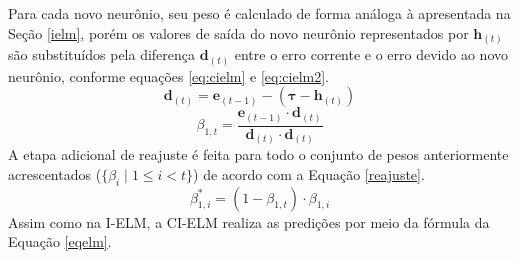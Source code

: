 Para cada novo neurônio, seu peso é calculado de forma análoga à apresentada na
Seção \ref{ielm}, porém os valores de saída do novo neurônio representados por
$\bm{h}_{(t)}$ são substituídos pela diferença $\bm{d}_{(t)}$
entre o erro corrente e o erro devido ao novo neurônio,
conforme equações \ref{eq:cielm} e \ref{eq:cielm2}.
\begin{equation}\label{eq:cielm}
\bm{d}_{(t)}=\bm{e}_{(t-1)} - (\bm{\tau} - \bm{h}_{(t)})
\end{equation}
\begin{equation}\label{eq:cielm2}
\beta_{1,t}=\frac{\bm{e}_{(t-1)}\cdot \bm{d}_{(t)}}
{\bm{d}_{(t)}\cdot \bm{d}_{(t)}}
\end{equation}
A etapa adicional de reajuste é feita para todo o conjunto de pesos anteriormente
acrescentados ($\{\beta_i \mid 1 \leq i < t\}$)
de acordo com a Equação \ref{reajuste}.
\begin{equation}\label{reajuste}
\beta_{1,i}^* = (1 - \beta_{1,t}) \cdot \beta_{1,i}
\end{equation}
Assim como na I-ELM, a CI-ELM realiza as predições por meio da fórmula da Equação \ref{eqelm}.

